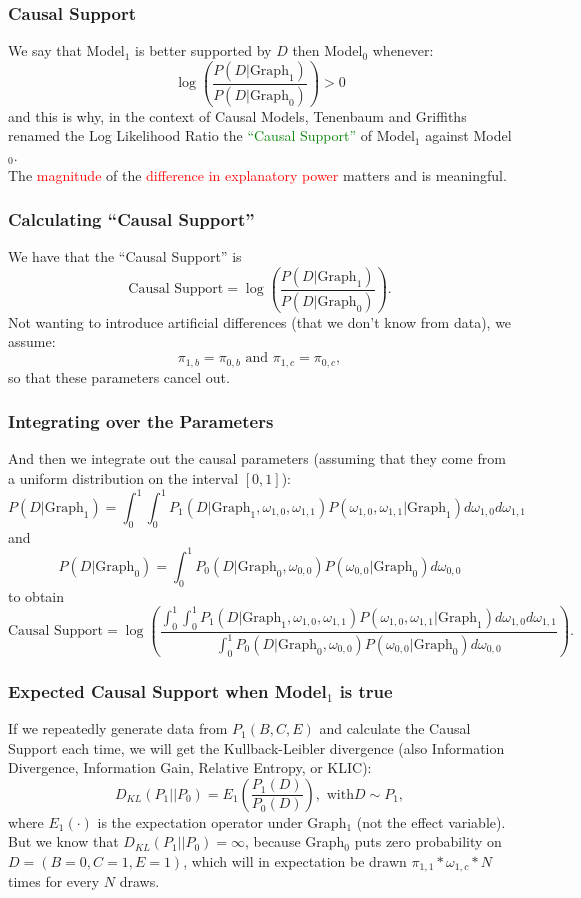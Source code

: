 \documentclass{beamer}
\begin{document}
\begin{frame}
\frametitle{Causal Support}
We say that Model$_1$ is better supported by $D$ then Model$_0$ whenever:
$$\log\left(\frac{P(D | \text{Graph}_1)}{P(D | \text{Graph}_0)}\right) >0$$
and this is why, in the context of Causal Models, Tenenbaum and Griffiths renamed the Log Likelihood Ratio the \textcolor{green}{``Causal Support''} of Model$_1$ against Model$_0$.\\
The \textcolor{red}{magnitude} of the \textcolor{red}{difference in explanatory power} matters and is meaningful.
\end{frame}
\begin{frame}
\frametitle{Calculating ``Causal Support''}
We have that the ``Causal Support'' is
$$\text{Causal Support} = \log\left(\frac{P(D | \text{Graph}_1)}{P(D | \text{Graph}_0)}\right).$$
Not wanting to introduce artificial differences (that we don't know from data), we assume:
$$\pi_{1, b} =\pi_{0, b} \text{ and } \pi_{1, c} =\pi_{0, c},$$
so that these parameters cancel out.
\end{frame}
\begin{frame}
\frametitle{Integrating over the Parameters}
And then we integrate out the causal parameters (assuming that they come from a uniform distribution on the interval $\left[ 0, 1 \right]$):
\footnotesize
$$P(D | \text{Graph}_1)=\int_0^1 \int_0^1 P_1(D | \text{Graph}_1, \omega_{1, 0}, \omega_{1, 1})P(\omega_{1, 0}, \omega_{1, 1} | \text{Graph}_1) d\omega_{1, 0} d\omega_{1, 1}$$
and
$$P(D | \text{Graph}_0)=\int_0^1 P_0(D | \text{Graph}_0, \omega_{0,0}) P(\omega_{0, 0} | \text{Graph}_0) d\omega_{0, 0}$$
to obtain
$$\text{Causal Support} = \log\left(\frac{\int_0^1 \int_0^1 P_1(D | \text{Graph}_1, \omega_{1, 0}, \omega_{1, 1})P(\omega_{1, 0}, \omega_{1, 1} | \text{Graph}_1) d\omega_{1, 0} d\omega_{1, 1}}{\int_0^1 P_0(D | \text{Graph}_0, \omega_{0,0}) P(\omega_{0, 0} | \text{Graph}_0) d\omega_{0, 0}}\right).$$
\normalsize
\end{frame}
\begin{frame}
\frametitle{Expected Causal Support when Model$_1$ is true}
If we repeatedly generate data from $P_1(B, C, E)$ and calculate the Causal Support each time, we will get the Kullback-Leibler divergence  (also Information Divergence, Information Gain, Relative Entropy, or KLIC):
$$D_{KL}(P_1 | | P_0)=E_1\left(\frac{P_1(D)}{P_0(D)}\right), \text{ with} D\sim P_1,$$
where $E_1(\cdot)$ is the expectation operator under Graph$_1$ (not the effect variable).\\
But we know that $D_{KL}(P_1 | | P_0)=\infty$, because Graph$_0$ puts zero probability on $D=(B=0, C=1, E=1)$, which will in expectation be drawn $\pi_{1, 1}*\omega_{1, c}*N$ times for every $N$ draws.
\end{frame}
\end{document}

